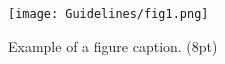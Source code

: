 \begin{figure}[htbp]
\centerline{\texttt{[image: Guidelines/fig1.png]}}
\caption{Example of a figure caption. (8pt)}
\label{fig}
\end{figure}